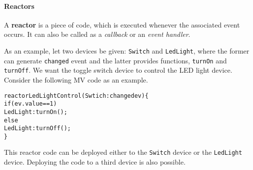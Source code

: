 \documentclass{note}
\begin{document}
\paragraph{Reactors}
A \textcolor{blue2}{\bf{}reactor} is a piece of code,
which is executed whenever the associated event occurs. 
It can also be called as a \textcolor{blue2}{\em callback\/} or an
\textcolor{blue2}{\em event handler\/}.  

As an example, let two devices be given: \textcolor{red2}{\texttt{Switch}} and 
\textcolor{red2}{\texttt{LedLight}}, where the former can generate
\textcolor{red2}{\texttt{changed}} event 
and the latter provides functions, 
\textcolor{red2}{\texttt{turnOn}} and 
\textcolor{red2}{\texttt{turnOff}}.
We want the toggle switch device to control the LED light device.
Consider the following MV code as an example.
\begin{alltt}
  \textcolor{red2}{reactor LedLightControl(Swtich:changed ev) \{
    if (ev.value == 1)
      LedLight:turnOn();
    else
      LedLight:turnOff();
  \}}
\end{alltt}
This reactor code can be deployed either to the
\textcolor{red2}{\texttt{Switch}} device 
or the \textcolor{red2}{\texttt{LedLight}} device. Deploying the code to a
third device is also possible.
\end{document}
